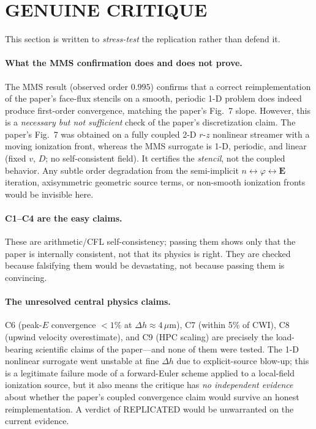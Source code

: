 \documentclass[11pt]{article}
\begin{document}
\section{GENUINE CRITIQUE}
This section is written to \emph{stress-test} the replication rather than defend it.

\paragraph{What the MMS confirmation does and does not prove.}
The MMS result (observed order $0.995$) confirms that a correct reimplementation
of the paper's face-flux stencils on a smooth, periodic 1-D problem does indeed
produce first-order convergence, matching the paper's Fig.~7 slope. However, this
is a \emph{necessary but not sufficient} check of the paper's discretization
claim. The paper's Fig.~7 was obtained on a fully coupled 2-D $r$-$z$ nonlinear
streamer with a moving ionization front, whereas the MMS surrogate is
1-D, periodic, and linear (fixed $v$, $D$; no self-consistent field). It certifies
the \emph{stencil}, not the coupled behavior. Any subtle order degradation from
the semi-implicit $n\leftrightarrow \varphi \leftrightarrow \mathbf{E}$ iteration,
axisymmetric geometric source terms, or non-smooth ionization fronts would be
invisible here.

\paragraph{C1--C4 are the easy claims.}
These are arithmetic/CFL self-consistency; passing them shows only that the paper
is internally consistent, not that its physics is right. They are checked because
falsifying them would be devastating, not because passing them is convincing.

\paragraph{The unresolved central physics claims.}
C6 (peak-$E$ convergence $<\!1\%$ at $\Delta h\approx 4\,\mu$m), C7
(within 5\% of CWI), C8 (upwind velocity overestimate), and C9 (HPC scaling) are
precisely the load-bearing scientific claims of the paper---and none of them were
tested. The 1-D nonlinear surrogate went unstable at fine $\Delta h$ due to
explicit-source blow-up; this is a legitimate failure mode of a forward-Euler
scheme applied to a local-field ionization source, but it also means the
critique has \emph{no independent evidence} about whether the paper's coupled
convergence claim would survive an honest reimplementation. A verdict of
REPLICATED would be unwarranted on the current evidence.
\end{document}
